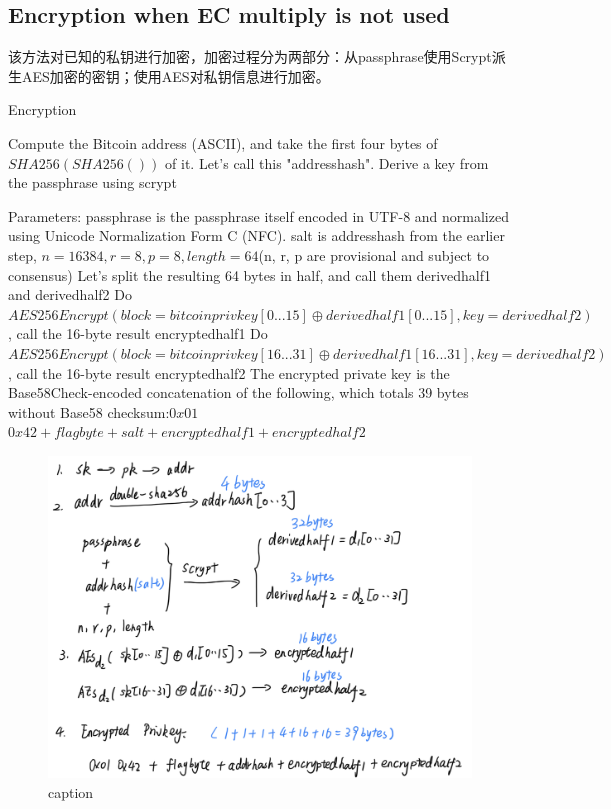 \subsection{Encryption when EC multiply is not used}
该方法对已知的私钥进行加密，加密过程分为两部分：从passphrase使用Scrypt派生AES加密的密钥；使用AES对私钥信息进行加密。

\begin{algorithm}[tbp]\footnotesize
\caption{Encryption}\label{encryption without ec multiply}
  	\begin{algorithmic}[1]
	    \STATE Compute the Bitcoin address (ASCII), and take the first four bytes of $SHA256(SHA256())$ of it. Let's call this "addresshash".
		\STATE Derive a key from the passphrase using scrypt  
		
		\STATE Parameters: passphrase is the passphrase itself encoded in UTF-8 and normalized using Unicode Normalization Form C (NFC). salt is addresshash from the earlier step, $n=16384, r=8, p=8, length=64 $(n, r, p are provisional and subject to consensus)  
		\STATE Let's split the resulting 64 bytes in half, and call them derivedhalf1 and derivedhalf2
		\STATE Do $AES256Encrypt(block = bitcoinprivkey[0...15] \oplus derivedhalf1[0...15], key = derivedhalf2)$, call the 16-byte result encryptedhalf1  
		\STATE Do $AES256Encrypt(block = bitcoinprivkey[16...31] \oplus derivedhalf1[16...31], key = derivedhalf2)$, call the 16-byte result encryptedhalf2 
		\STATE The encrypted private key is the Base58Check-encoded concatenation of the following, which totals 39 bytes without Base58 checksum:$0x01$ $0x42 + flagbyte + salt + encryptedhalf1 + encryptedhalf2$
    \end{algorithmic}
\end{algorithm}

\begin{figure}[h]
\centering
\includegraphics[width=.7\textwidth]{./no-ec.png}
\caption{caption}\label{fig-parsesig}
\end{figure}

